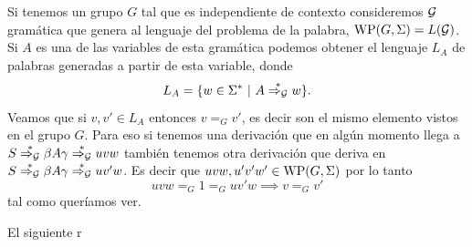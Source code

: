 \documentclass[tesis.tex]{subfiles}
\begin{document}
\begin{obs}\label{palabras-wp}
	Si tenemos un grupo $G$ tal que es independiente de contexto consideremos $\cal G$ gramática que genera al lenguaje del problema de la palabra, $\text{WP}(G, \Sigma) = L(\cal G)$.
	Si $A$ es una de las variables de esta gramática podemos obtener el lenguaje $L_A$ de palabras generadas a partir de esta variable, donde
	\[
	L_A = \{ w \in \Sigma^*  \ | \ A \overset{*}{\Rightarrow_{\cal G}} w  \}.
	\]
	Veamos que si $v,v' \in L_A$ entonces $v =_G v'$, es decir son el mismo elemento vistos en el grupo $G$. 
	Para eso si tenemos una derivación que en algún momento llega a $S \overset{*}{\Rightarrow_{\cal G}} \beta A \gamma \overset{*}{\Rightarrow_{\cal G}} uvw$ también tenemos otra derivación que deriva en $S \overset{*}{\Rightarrow_{\cal G}} \beta A \gamma  \overset{*}{\Rightarrow_{\cal G}} uv'w$. 
	Es decir que $uvw, u'v'w' \in \text{WP}(G, \Sigma)$ por lo tanto 
	\begin{equation*}
		uvw =_G 1 =_G uv'w \implies v =_G v'
	\end{equation*}
	tal como queríamos ver.
\end{obs}




El siguiente r
\end{document}
